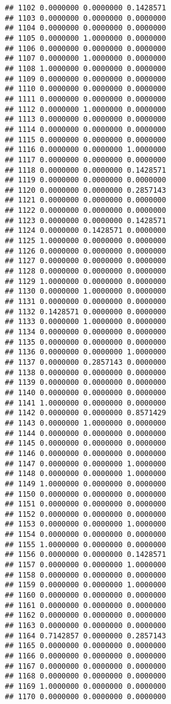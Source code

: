 \documentclass[
]{article}
\begin{document}
\begin{verbatim}
## 1102 0.0000000 0.0000000 0.1428571
## 1103 0.0000000 0.0000000 0.0000000
## 1104 0.0000000 0.0000000 0.0000000
## 1105 0.0000000 1.0000000 0.0000000
## 1106 0.0000000 0.0000000 0.0000000
## 1107 0.0000000 1.0000000 0.0000000
## 1108 1.0000000 0.0000000 0.0000000
## 1109 0.0000000 0.0000000 0.0000000
## 1110 0.0000000 0.0000000 0.0000000
## 1111 0.0000000 0.0000000 0.0000000
## 1112 0.0000000 1.0000000 0.0000000
## 1113 0.0000000 0.0000000 0.0000000
## 1114 0.0000000 0.0000000 0.0000000
## 1115 0.0000000 0.0000000 0.0000000
## 1116 0.0000000 0.0000000 1.0000000
## 1117 0.0000000 0.0000000 0.0000000
## 1118 0.0000000 0.0000000 0.1428571
## 1119 0.0000000 0.0000000 0.0000000
## 1120 0.0000000 0.0000000 0.2857143
## 1121 0.0000000 0.0000000 0.0000000
## 1122 0.0000000 0.0000000 0.0000000
## 1123 0.0000000 0.0000000 0.1428571
## 1124 0.0000000 0.1428571 0.0000000
## 1125 1.0000000 0.0000000 0.0000000
## 1126 0.0000000 0.0000000 0.0000000
## 1127 0.0000000 0.0000000 0.0000000
## 1128 0.0000000 0.0000000 0.0000000
## 1129 1.0000000 0.0000000 0.0000000
## 1130 0.0000000 1.0000000 0.0000000
## 1131 0.0000000 0.0000000 0.0000000
## 1132 0.1428571 0.0000000 0.0000000
## 1133 0.0000000 1.0000000 0.0000000
## 1134 0.0000000 0.0000000 0.0000000
## 1135 0.0000000 0.0000000 0.0000000
## 1136 0.0000000 0.0000000 1.0000000
## 1137 0.0000000 0.2857143 0.0000000
## 1138 0.0000000 0.0000000 0.0000000
## 1139 0.0000000 0.0000000 0.0000000
## 1140 0.0000000 0.0000000 0.0000000
## 1141 1.0000000 0.0000000 0.0000000
## 1142 0.0000000 0.0000000 0.8571429
## 1143 0.0000000 1.0000000 0.0000000
## 1144 0.0000000 0.0000000 0.0000000
## 1145 0.0000000 0.0000000 0.0000000
## 1146 0.0000000 0.0000000 0.0000000
## 1147 0.0000000 0.0000000 1.0000000
## 1148 0.0000000 0.0000000 1.0000000
## 1149 1.0000000 0.0000000 0.0000000
## 1150 0.0000000 0.0000000 0.0000000
## 1151 0.0000000 0.0000000 0.0000000
## 1152 0.0000000 0.0000000 0.0000000
## 1153 0.0000000 0.0000000 1.0000000
## 1154 0.0000000 0.0000000 0.0000000
## 1155 1.0000000 0.0000000 0.0000000
## 1156 0.0000000 0.0000000 0.1428571
## 1157 0.0000000 0.0000000 1.0000000
## 1158 0.0000000 0.0000000 0.0000000
## 1159 0.0000000 0.0000000 1.0000000
## 1160 0.0000000 0.0000000 0.0000000
## 1161 0.0000000 0.0000000 0.0000000
## 1162 0.0000000 0.0000000 0.0000000
## 1163 0.0000000 0.0000000 0.0000000
## 1164 0.7142857 0.0000000 0.2857143
## 1165 0.0000000 0.0000000 0.0000000
## 1166 0.0000000 0.0000000 0.0000000
## 1167 0.0000000 0.0000000 0.0000000
## 1168 0.0000000 0.0000000 0.0000000
## 1169 1.0000000 0.0000000 0.0000000
## 1170 0.0000000 0.0000000 0.0000000

\end{verbatim}
\end{document}
